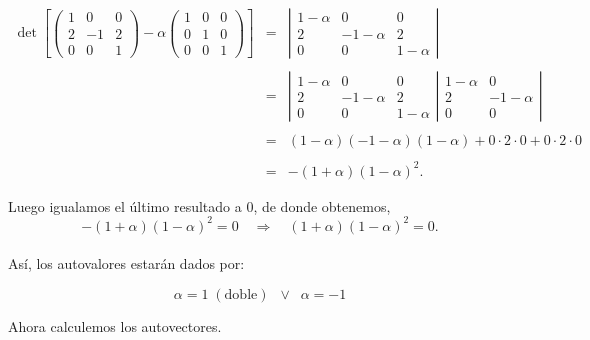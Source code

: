 \begin{enumerate}
    $$ \begin{array}{rcl} 
	\det \left[
    \left(\begin{array}{*{3}{r}}
	1 & 0 & 0 \\
	2 & -1 & 2 \\
	0 & 0 & 1 
    \end{array}\right) - \alpha 
    \left(\begin{array}{*{3}{r}}
	1 & 0 & 0 \\
	0 & 1 & 0 \\
	0 & 0 & 1
\end{array}\right)\right] & = & 
    \left|\begin{array}{*{3}{c}}
	1-\alpha & 0 & 0 \\
	2 & -1-\alpha & 2 \\
	0 & 0 & 1-\alpha
	\end{array}\right| \\\\ 
	&=&  
	\left|\begin{array}{*{3}{c}}
	1-\alpha & 0 & 0 \\
	2 & -1-\alpha & 2 \\
	0 & 0 & 1-\alpha
	\end{array}\right|
	\left.\begin{array}{*{3}{c}}
	1-\alpha & 0  \\
	2 & -1-\alpha  \\
	0 & 0
	\end{array}\right|\\\\
	&=&(1-\alpha)(-1-\alpha)(1-\alpha)+0\cdot 2 \cdot 0 + 0\cdot 2 \cdot 0\\\\
	&=&-(1+\alpha)\left(1-\alpha\right)^2.
    \end{array}$$

    Luego igualamos el último resultado a $0$, de donde obtenemos,\\
    $$-(1+\alpha)\left(1-\alpha\right)^2=0\quad \Rightarrow \quad (1+\alpha)\left(1-\alpha\right)^2=0.$$\\
    Así, los autovalores estarán dados por:
    \begin{tcolorbox}
	$$\alpha=1\; (\mbox{doble})  \;\;\lor\;\; \alpha=-1$$
    \end{tcolorbox}
    \vspace*{.2cm}

    Ahora calculemos los autovectores.

    \begin{itemize}


\end{itemize}
\end{enumerate}
